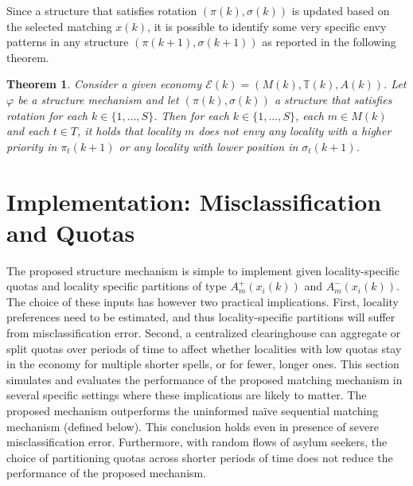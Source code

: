\documentclass[12pt,fleqn]{article}
\newtheorem{theorem}{Theorem}
\begin{document}
\noindent Since a structure that satisfies rotation $(\pi(k),\sigma(k))$ is updated based on the selected matching $x(k)$, it is possible to identify some very specific envy patterns in any structure $(\pi(k+1),\sigma(k+1))$ as reported in the following theorem.
\begin{theorem}\rm\label{TH:structures}
Consider a given economy $\mathcal{E}(k)=(M(k),\mathbb{T}(k),A(k))$. Let $\varphi$ be a structure mechanism and let $(\pi(k),\sigma(k))$ a structure that satisfies rotation for each $k\in \{1,\ldots,S\}$. Then for each
$k\in\{1,\ldots,S\}$, each $m\in M(k)$ and each $t\in T$, it holds that locality $m$ does not envy any
locality with a higher priority in $\pi_t(k+1)$ or any locality with lower position in $\sigma_t(k+1)$.
\end{theorem}

\section{Implementation: Misclassification and Quotas}\label{SEC:simulations}
The proposed structure mechanism is simple to implement given locality-specific quotas and locality specific partitions of type $A^+_m(x_i(k))$ and $A^-_m(x_i(k))$. The choice of these inputs has however two practical implications. First, locality preferences need to be estimated, and thus locality-specific partitions will suffer from misclassification error. Second, a centralized clearinghouse can aggregate or split quotas over periods of time to affect whether localities with low quotas stay in the economy for multiple shorter spells, or for fewer, longer ones. This section simulates and evaluates the performance of the proposed matching mechanism in several specific settings where these implications are likely to matter. The proposed mechanism outperforms the uninformed na\"{i}ve sequential matching mechanism (defined below). This conclusion holds even in presence of severe misclassification error. Furthermore, with random flows of asylum seekers, the choice of partitioning quotas across shorter periods of time does not reduce the performance of the proposed mechanism.
\end{document}
